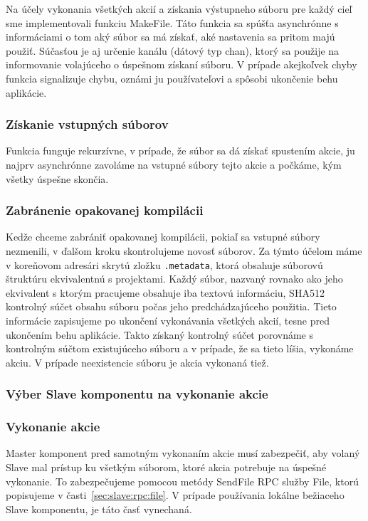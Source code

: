 Na účely vykonania všetkých akcií a získania výstupneho súboru pre každý cieľ sme
implementovali funkciu MakeFile. Táto funkcia sa spúšťa asynchrónne s informáciami
o tom aký súbor sa má získať, aké nastavenia sa pritom majú použiť. Súčasťou je
aj určenie kanálu (dátový typ chan), ktorý sa použije na informovanie volajúceho
o úspešnom získaní súboru. V prípade akejkoľvek chyby funkcia signalizuje chybu,
oznámi ju používateľovi a spôsobi ukončenie behu aplikácie.

\subsubsection{Získanie vstupných súborov}

Funkcia funguje rekurzívne, v prípade, že súbor sa dá získať spustením akcie, ju
najprv asynchrónne zavoláme na vstupné súbory tejto akcie a počkáme, kým všetky
úspešne skončia.

\subsubsection{Zabránenie opakovanej kompilácii}

Kedže chceme zabrániť opakovanej kompilácii, pokiaľ sa vstupné súbory nezmenili,
v ďalšom kroku skontrolujeme novosť súborov. Za týmto účelom máme v koreňovom
adresári skrytú zložku \texttt{.metadata}, ktorá obsahuje súborovú štruktúru
ekvivalentnú s projektami. Každý súbor, nazvaný rovnako ako jeho ekvivalent s ktorým
pracujeme obsahuje iba textovú informáciu, SHA512 kontrolný súčet obsahu súboru
počas jeho predchádzajúceho použitia. Tieto informácie zapisujeme po ukončení vykonávania
všetkých akcií, tesne pred ukončením behu aplikácie. Takto získaný kontrolný súčet
porovnáme s kontrolným súčtom existujúceho súboru a v prípade, že sa tieto líšia,
vykonáme akciu. V prípade neexistencie súboru je akcia vykonaná tiež.

\subsubsection{Výber Slave komponentu na vykonanie akcie}


\subsubsection{Vykonanie akcie}

Master komponent pred samotným vykonaním akcie musí zabezpečiť, aby volaný Slave
mal prístup ku všetkým súborom, ktoré akcia potrebuje na úspešné vykonanie. To
zabezpečujeme pomocou metódy SendFile RPC služby File, ktorú popisujeme v časti~\ref{sec:slave:rpc:file}.
V prípade používania lokálne bežiaceho Slave komponentu, je táto časť vynechaná.

